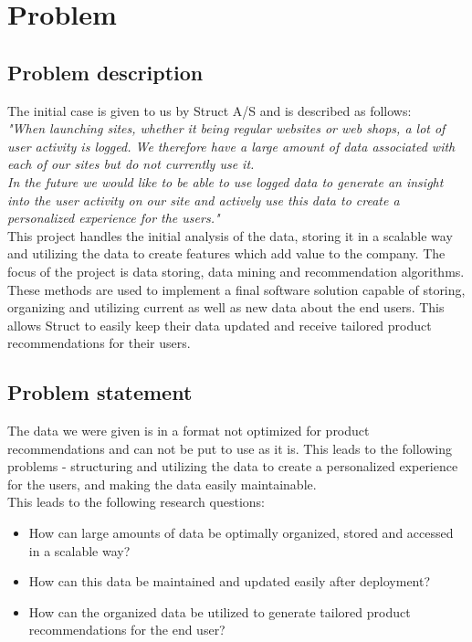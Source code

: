 
\chapter{Problem} %

\label{Chapter1} %


\section{Problem description}

The initial case is given to us by Struct A/S and is described as follows: \\

\textit{"When launching sites, whether it being regular websites or web shops, a lot of user activity is logged. We therefore have a large amount of data associated with each of our sites but do not currently use it.} \\
\textit{In the future we would like to be able to use logged data to generate an insight into the user activity on our site and actively use this data to create a personalized experience for the users."} \\

This project handles the initial analysis of the data, storing it in a scalable way and utilizing the data to create features which add value to the company. The focus of the project is data storing, data mining and recommendation algorithms. These methods are used to implement a final software solution capable of storing, organizing and utilizing current as well as new data about the end users. This allows Struct to easily keep their data updated and receive tailored product recommendations for their users.





\section{Problem statement}
The data we were given is in a format not optimized for product recommendations and can not be put to use as it is. This leads to the following problems - structuring and utilizing the data to create a personalized experience for the users, and making the data easily maintainable. \\
This leads to the following research questions:
\begin{itemize}
\item How can large amounts of data be optimally organized, stored and accessed in a scalable way?
\item How can this data be maintained and updated easily after deployment?
\item How can the organized data be utilized to generate tailored product recommendations for the end user?
\end{itemize}
